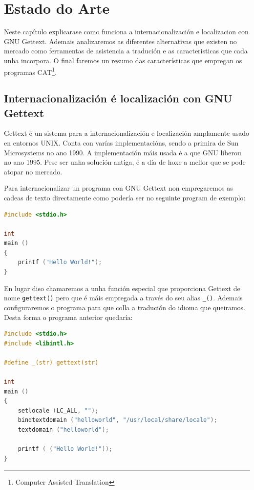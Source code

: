 \chapter[Estado do arte]{Estado do Arte\label{estado_do_arte}}

Neste capítulo explicarase como funciona a internacionalización e localizacion con GNU Gettext. Ademais analizaremos as diferentes alternativas que existen no mercado como ferramentas de asistencia a tradución e as caracteristicas que cada unha incorpora. O final faremos un resumo das características que empregan os programas CAT\footnote{Computer Assisted Translation}.

\section{Internacionalización é localización con GNU Gettext}
Gettext é un sistema para a internacionalización e localización amplamente usado en entornos UNIX. Conta con varías implementacións, sendo a primira de Sun Microsystems no ano 1990. A implementación máis usada é a que GNU liberou no ano 1995. Pese ser unha solución antiga, é a día de hoxe a mellor que se pode atopar no mercado.

Para internacionalizar un programa con GNU Gettext non empregaremos as cadeas de texto directamente como podería ser no seguinte program de exemplo:

\begin{lstlisting}[language=C,label=some-code,caption=Some Code]
#include <stdio.h>

int
main ()
{
    printf ("Hello World!");
}
\end{lstlisting}

En lugar diso chamaremos a unha función especial que proporciona Gettext de nome \lstinline{gettext()} pero que é máis empregada a través do seu alias \lstinline{_()}. Ademais configuraremos o programa para que colla a tradución do idioma que queiramos. Desta forma o programa anterior quedaría:

\begin{lstlisting}[language=C,label=some-code,caption=Some Code]
#include <stdio.h>
#include <libintl.h>

#define _(str) gettext(str)

int
main ()
{
    setlocale (LC_ALL, "");
    bindtextdomain ("helloworld", "/usr/local/share/locale");
    textdomain ("helloworld");

    printf (_("Hello World!"));
}
\end{lstlisting}


